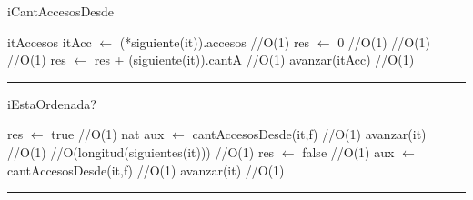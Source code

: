 \begin{algorithm}[H]
\caption{iCantAccesosDesde}
\begin{algorithmic}[1]
\state itAccesos itAcc $\gets$ (*siguiente(it)).accesos \hfill //O(1)
\state res $\gets$ 0 \hfill //O(1)
 \hfill //O(1)
 \hfill //O(1)
\state res $\gets$ res + (siguiente(it)).cantA \hfill //O(1)
\endif
\state avanzar(itAcc) \hfill //O(1)
\endwhile
\EndFunction 
\end{algorithmic}
\hrule
{}
\end{algorithm}

\begin{algorithm}[H]
\caption{iEstaOrdenada?}
\begin{algorithmic}[1]
\state res $\gets$ true \hfill //O(1)
\state nat aux $\gets$ cantAccesosDesde(it,f) \hfill //O(1)
\state avanzar(it) \hfill //O(1)
 \hfill //O(longitud(siguientes(it)))
 \hfill //O(1)
\state res $\gets$ false \hfill //O(1)
\endif
\state aux $\gets$ cantAccesosDesde(it,f) \hfill //O(1)
\state avanzar(it) \hfill //O(1)
\endwhile
\EndFunction 
\end{algorithmic}
\hrule
{}
\end{algorithm}
